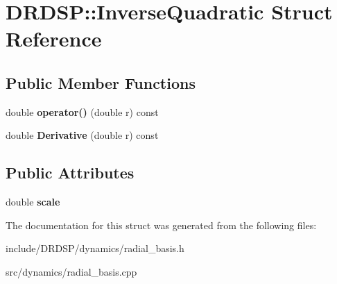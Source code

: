 \hypertarget{struct_d_r_d_s_p_1_1_inverse_quadratic}{\section{D\-R\-D\-S\-P\-:\-:Inverse\-Quadratic Struct Reference}
\label{struct_d_r_d_s_p_1_1_inverse_quadratic}
}
\subsection*{Public Member Functions}
\begin{DoxyCompactItemize}
\item 
\hypertarget{struct_d_r_d_s_p_1_1_inverse_quadratic_a8046e278ab0c485750ff062c6862ec87}{double {\bfseries operator()} (double r) const }\label{struct_d_r_d_s_p_1_1_inverse_quadratic_a8046e278ab0c485750ff062c6862ec87}

\item 
\hypertarget{struct_d_r_d_s_p_1_1_inverse_quadratic_a628c78a421c55898e94846eeb1865326}{double {\bfseries Derivative} (double r) const }\label{struct_d_r_d_s_p_1_1_inverse_quadratic_a628c78a421c55898e94846eeb1865326}

\end{DoxyCompactItemize}
\subsection*{Public Attributes}
\begin{DoxyCompactItemize}
\item 
\hypertarget{struct_d_r_d_s_p_1_1_inverse_quadratic_a31241ecd1ec571b651307d29e6b69c07}{double {\bfseries scale}}\label{struct_d_r_d_s_p_1_1_inverse_quadratic_a31241ecd1ec571b651307d29e6b69c07}

\end{DoxyCompactItemize}


The documentation for this struct was generated from the following files\-:\begin{DoxyCompactItemize}
\item 
include/\-D\-R\-D\-S\-P/dynamics/radial\-\_\-basis.\-h\item 
src/dynamics/radial\-\_\-basis.\-cpp\end{DoxyCompactItemize}
